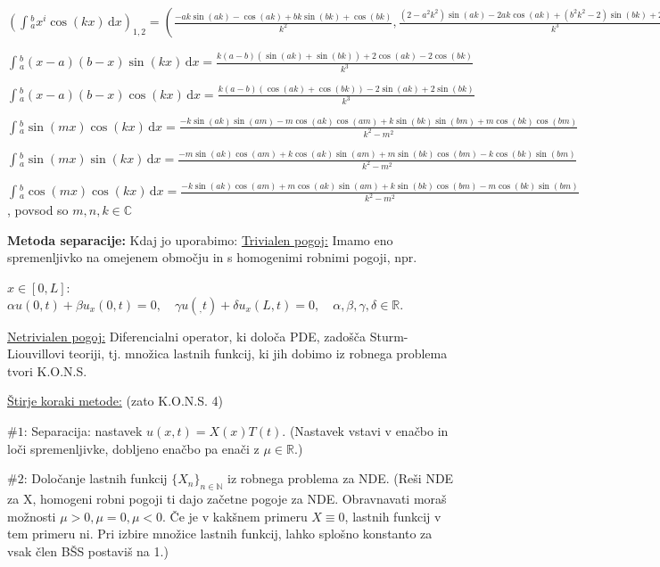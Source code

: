\documentclass[8pt,a4paper]{amsart}
\theoremstyle{definition} %
\theoremstyle{plain} %
\newcommand{\dx}{\ensuremath{\,\mathrm{d}x}}
\let\oldint\int
\renewcommand{\int}{\oldint \!}
\newcommand{\R}{\mathbb R}
\newcommand{\N}{\mathbb N}
\newcommand{\C}{\mathbb C}
\begin{document}
$(\int_a^bx^i \cos(kx)\dx)_{1,2} = (\frac{-a k \sin (a k)-\cos (a k)+b k \sin (b k)+\cos (b k)}{k^2},\frac{(2-a^2 k^2) \sin (a k)-2 a k \cos (a k)+(b^2 k^2-2) \sin (b k)+2 b k \cos (b k)}{k^3})$

$\int_a^b (x-a)(b-x)\sin(kx)\dx = \frac{k (a-b) (\sin (a k)+\sin (b k))+2 \cos (a k)-2 \cos (b k)}{k^3}$

$\int_a^b (x-a)(b-x)\cos(kx)\dx = \frac{k (a-b) (\cos (a k)+\cos (b k))-2 \sin (a k)+2 \sin (b k)}{k^3}$

$\int_a^b \sin(mx)\cos(kx)\dx = \frac{-k \sin (a k) \sin (a m)-m \cos (a k) \cos (a m)+k \sin (b k) \sin (b m)+m \cos (b k) \cos (b m)}{k^2-m^2}$

$\int_a^b \sin(mx)\sin(kx)\dx = \frac{-m \sin (a k) \cos (a m)+k \cos (a k) \sin (a m)+m \sin (b k) \cos (b m)-k \cos (b k) \sin (b m)}{k^2-m^2}$

$\int_a^b \cos(mx)\cos(kx)\dx = \frac{-k \sin (a k) \cos (a m)+m \cos (a k) \sin (a m)+k \sin (b k) \cos (b m)-m \cos (b k) \sin (b m)}{k^2-m^2}$, povsod so $m, n, k \in \C$


\textbf{Metoda separacije:} Kdaj jo uporabimo: \underline{Trivialen pogoj:}
Imamo eno spremenljivko na omejenem območju in s homogenimi robnimi pogoji, npr.

$x \in [0,L]$: $\alpha u(0,t) + \beta u_x(0,t) = 0, \quad \gamma u(_,t)+\delta
u_x(L,t) = 0, \quad \alpha, \beta, \gamma, \delta \in \R.$

\underline{Netrivialen pogoj:} Diferencialni operator, ki določa PDE, zadošča
Sturm-Liouvillovi teoriji, tj. množica lastnih funkcij, ki jih dobimo iz robnega
problema tvori K.O.N.S.


\underline{Štirje koraki metode:} (zato K.O.N.S. 4)

$\#1$: Separacija: nastavek $u(x,t)=X(x)T(t)$. (Nastavek vstavi v enačbo in loči
spremenljivke, dobljeno enačbo pa enači z $\mu \in \R$.)

$\#2$: Določanje lastnih funkcij $\{X_n\}_{n\in \N}$ iz robnega problema za NDE.
(Reši NDE za X, homogeni robni pogoji ti dajo začetne pogoje za NDE. Obravnavati
moraš možnosti $\mu >0, \mu = 0, \mu < 0$. Če je v kakšnem primeru $X \equiv 0$,
lastnih funkcij v tem primeru ni. Pri izbire množice lastnih funkcij, lahko
splošno konstanto za vsak člen BŠS postaviš na 1.)
\end{document}
